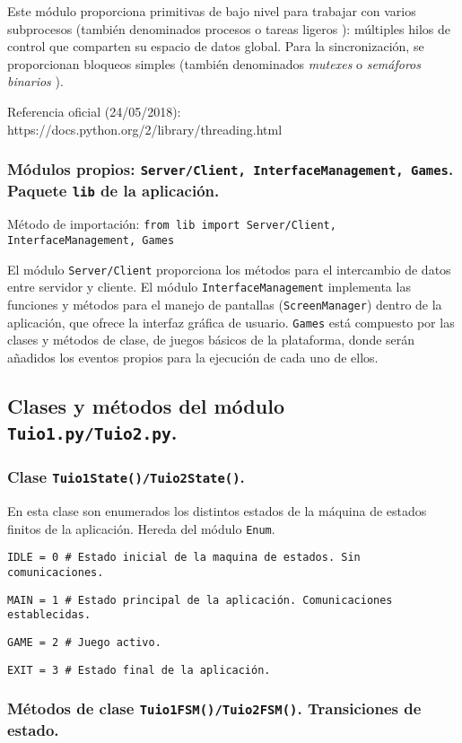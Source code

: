 Este módulo proporciona primitivas de bajo nivel para trabajar con varios subprocesos (también denominados procesos o tareas ligeros ): múltiples hilos de control que comparten su espacio de datos global. Para la sincronización, se proporcionan bloqueos simples (también denominados \emph{mutexes} o \emph{semáforos binarios} ).

Referencia oficial (24/05/2018):  https://docs.python.org/2/library/threading.html

\subsubsection{Módulos propios: \texttt{Server/Client, InterfaceManagement, Games}. Paquete \texttt{lib} de la aplicación.}
Método de importación: \texttt{from lib import Server/Client, InterfaceManagement, Games}

El módulo \texttt{Server/Client} proporciona los métodos para el intercambio de datos entre servidor y cliente.
El módulo \texttt{InterfaceManagement} implementa las funciones y métodos para el manejo de pantallas (\texttt{ScreenManager}) dentro de la aplicación, que ofrece la interfaz gráfica de usuario.
\texttt{Games} está compuesto por las clases y métodos de clase, de juegos básicos de la plataforma, donde serán añadidos los eventos propios para la ejecución de cada uno de ellos.

\subsection{Clases y métodos del módulo \texttt{Tuio1.py/Tuio2.py}.}

\subsubsection{Clase \texttt{Tuio1State()/Tuio2State()}.}
En esta clase son enumerados los distintos estados de la máquina de estados finitos de la aplicación. Hereda del módulo \texttt{Enum}.

\texttt{IDLE = 0  \# Estado inicial de la maquina de estados. Sin comunicaciones.}

\texttt{MAIN = 1  \# Estado principal de la aplicación. Comunicaciones establecidas.}

\texttt{GAME = 2  \# Juego activo.}

\texttt{EXIT = 3  \# Estado final de la aplicación.}

\subsubsection{Métodos de clase \texttt{Tuio1FSM()/Tuio2FSM()}. Transiciones de estado.}


